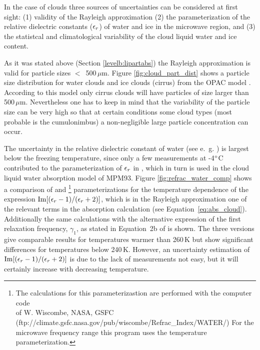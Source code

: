 {
\label{levelb:ref_uncert_clouds}
In the case of clouds three sources of uncertainties can be considered
at first sight: (1) validity of the Rayleigh approximation (2) the 
parameterization of the relative dielectric constants ($\epsilon_r$) of water 
and ice in the microwave region, and (3) the statistcal and
climatological variability of the cloud liquid water and ice content.

As it was stated above (Section \ref{levelb:lipartabs}) the Rayleigh 
approximation is valid for particle sizes $<$~500\,$\mu$m. Figure 
\ref{fig:cloud_part_dist} shows a particle size distribution for water
clouds and ice clouds (cirrus) from the OPAC model \citep{hess:98}. 
According to this model only cirrus clouds will have particles of size
larger than 500\,$\mu$m. Nevertheless one has to keep in mind that the
variability of the particle size can be very high so that at certain 
conditions some cloud types (most probable is the cumulonimbus) 
a non-negligible large particle concentration can occur.

The uncertainty in the relative dielectric constant of water 
(see e.~g. \citet{liptonetal:99}) is largest below the freezing 
temperature, since only a few measurements at -4$^{\rm o}$C 
contributed to the parameterization of $\epsilon_r$ in \cite{liebeetal:91}, 
which in turn is used in the cloud liquid water absorption model of MPM93. 
Figure \ref{fig:refrac_water_comp} shows a comparison of 
\cite{liebeetal:91} and \cite{ray:72}\footnote{{The calculations
  for this parameterizastion are performed with the computer code}\\{
   of W. Wiscombe, NASA, GSFC}\\
  (ftp://climate.gsfc.nasa.gov/pub/wiscombe/Refrac\_Index/WATER/)
  For the microwave frequency range this program uses the
  \cite{ray:72} temperature parameterization.} parameterizations 
for the temperature dependence of the expression
$\mathrm{Im}{[(\epsilon_r-1)/(\epsilon_r+2)]}$, which is in the Rayleigh approximation 
one of the relevant terms in the absorption calculation (see 
Equation~\ref{eq:abs_cloud}). Additionally the same calculations with 
the alternative expression of the first  relaxation frequency, 
$\gamma_1$, as stated in Equation~2b of \cite{liebeetal:91} is shown. 
The three versions give comparable results for temperatures warmer 
than 260\,K but show significant  differences for temperatures below 
240\,K. However, an uncertainty estimation of $\mathrm{Im}{[(\epsilon_r-1)/(\epsilon_r+2)]}$ 
is due to the lack of measurements not easy, but it will certainly
increase with decreasing temperature.

}
